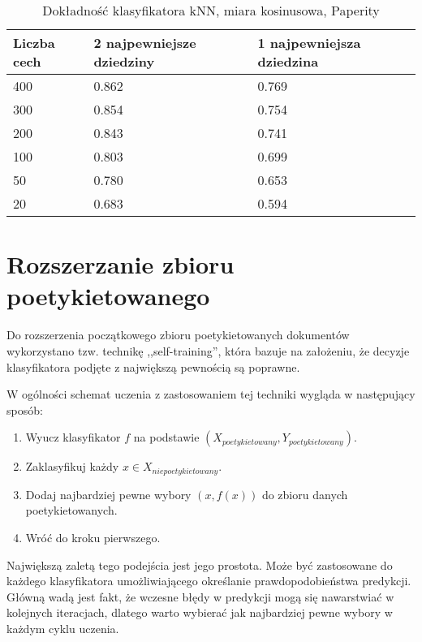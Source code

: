 \documentclass{pracamgr}
\begin{document}
\begin{table}[]
\centering
\begin{tabular}{@{}lll@{}}
\toprule
Liczba cech & 2 najpewniejsze dziedziny & 1 najpewniejsza dziedzina \\ \midrule
400         & 0.862                  & 0.769                 \\
300         & 0.854                  & 0.754                 \\
200         & 0.843                  & 0.741                 \\
100         & 0.803                  & 0.699                 \\
50          & 0.780                  & 0.653                 \\
20          & 0.683                  & 0.594                 \\ \bottomrule
\end{tabular}
\caption{Dokładność klasyfikatora kNN, miara kosinusowa, Paperity}
\label{kNN-accuracy-initial-set}
\end{table}

\section{Rozszerzanie zbioru poetykietowanego}
Do rozszerzenia początkowego zbioru poetykietowanych dokumentów wykorzystano tzw. technikę ,,self-training'', która bazuje na założeniu, że decyzje klasyfikatora podjęte z największą pewnością są poprawne.

W ogólności schemat uczenia z zastosowaniem tej techniki wygląda w następujący sposób:

\begin{enumerate}
    \item Wyucz klasyfikator $f$ na podstawie $(X_{poetykietowany}, Y_{poetykietowany})$.
    \item Zaklasyfikuj każdy $x \in X_{niepoetykietowany}$.
    \item Dodaj najbardziej pewne wybory $(x, f(x))$ do zbioru danych poetykietowanych.
    \item Wróć do kroku pierwszego.
\end{enumerate}

Największą zaletą tego podejścia jest jego prostota. Może być zastosowane do każdego klasyfikatora umożliwiającego określanie prawdopodobieństwa predykcji. Główną wadą jest fakt, że wczesne błędy w predykcji mogą się nawarstwiać w kolejnych iteracjach, dlatego warto wybierać jak najbardziej pewne wybory w każdym cyklu uczenia.
\end{document}
